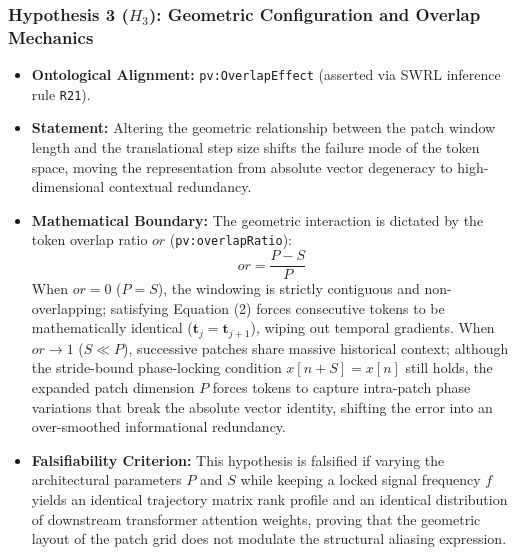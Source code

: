 \subsubsection{Hypothesis 3 ($H_3$): Geometric Configuration and Overlap Mechanics}
\begin{itemize}
    \item \textbf{Ontological Alignment:} \texttt{pv:OverlapEffect} (asserted via SWRL inference rule \texttt{R21}).
    \item \textbf{Statement:} Altering the geometric relationship between the patch window length and the translational step size shifts the failure mode of the token space, moving the representation from absolute vector degeneracy to high-dimensional contextual redundancy.
    \item \textbf{Mathematical Boundary:} The geometric interaction is dictated by the token overlap ratio $or$ (\texttt{pv:overlapRatio}):
\begin{equation}
	or = \frac{P - S}{P}
\end{equation}
When $or = 0$ ($P = S$), the windowing is strictly contiguous and non-overlapping; satisfying Equation (2) forces consecutive tokens to be mathematically identical ($\mathbf{t}_j = \mathbf{t}_{j+1}$), wiping out temporal gradients. When $or \to 1$ ($S \ll P$), successive patches share massive historical context; although the stride-bound phase-locking condition $x[n+S] = x[n]$ still holds, the expanded patch dimension $P$ forces tokens to capture intra-patch phase variations that break the absolute vector identity, shifting the error into an over-smoothed informational redundancy.
\item \textbf{Falsifiability Criterion:} This hypothesis is falsified if varying the architectural parameters $P$ and $S$ while keeping a locked signal frequency $f$ yields an identical trajectory matrix rank profile and an identical distribution of downstream transformer attention weights, proving that the geometric layout of the patch grid does not modulate the structural aliasing expression.
\end{itemize}
